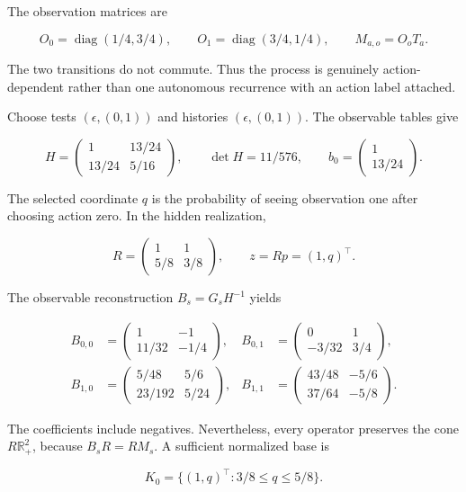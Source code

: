 \documentclass[11pt,letterpaper]{article}
\begin{document}
The observation matrices are

\[
O_0=\operatorname{diag}(1/4,3/4),\qquad
O_1=\operatorname{diag}(3/4,1/4),\qquad
M_{a,o}=O_oT_a.
\]

The two transitions do not commute. Thus the process is genuinely
action-dependent rather than one autonomous recurrence with an action
label attached.

Choose tests \((\epsilon,(0,1))\) and histories \((\epsilon,(0,1))\).
The observable tables give

\[
H=\begin{pmatrix}1&13/24\\13/24&5/16\end{pmatrix},\qquad
\det H=11/576,\qquad
b_0=\begin{pmatrix}1\\13/24\end{pmatrix}.
\]

The selected coordinate \(q\) is the probability of seeing observation
one after choosing action zero. In the hidden realization,

\[
R=\begin{pmatrix}1&1\\5/8&3/8\end{pmatrix},\qquad
z=Rp=(1,q)^\top.
\]

The observable reconstruction \(B_s=G_sH^{-1}\) yields

\[
\begin{aligned}
B_{0,0}&=\begin{pmatrix}1&-1\\11/32&-1/4\end{pmatrix},&
B_{0,1}&=\begin{pmatrix}0&1\\-3/32&3/4\end{pmatrix},\\[4pt]
B_{1,0}&=\begin{pmatrix}5/48&5/6\\23/192&5/24\end{pmatrix},&
B_{1,1}&=\begin{pmatrix}43/48&-5/6\\37/64&-5/8\end{pmatrix}.
\end{aligned}
\]

The coefficients include negatives. Nevertheless, every operator
preserves the cone \(R\mathbb R^2_+\), because \(B_sR=RM_s\). A
sufficient normalized base is

\[
K_0=\{(1,q)^\top:3/8\leq q\leq5/8\}.
\]
\end{document}
